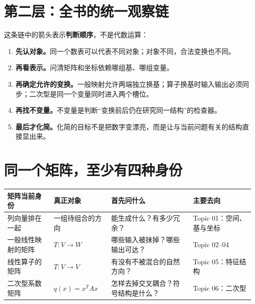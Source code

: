 \documentclass[11pt,a4paper]{ctexart}
\newcommand{\kw}[1]{\textbf{\color{deep}#1}}
\begin{document}
\section{第二层：全书的统一观察链}

\begin{center}
\end{center}

这条链中的箭头表示\kw{判断顺序}，不是代数运算：

\begin{enumerate}
  \item \kw{先认对象。}同一个数表可以代表不同对象；对象不同，合法变换也不同。
  \item \kw{再看表示。}问清矩阵和坐标依赖哪组基、哪组变量。
  \item \kw{再确定允许的变换。}一般映射允许两端独立换基；算子换基时输入输出必须同步；二次型是同一个变量同时进入两个槽位。
  \item \kw{再找不变量。}不变量是判断“变换前后仍在研究同一结构”的检查器。
  \item \kw{最后才化简。}化简的目标不是把数字变漂亮，而是让与当前问题有关的结构直接显出来。
\end{enumerate}

\section{同一个矩阵，至少有四种身份}

\begin{longtable}{L{3.2cm}L{3.3cm}L{5.2cm}L{3.7cm}}
\toprule
\textbf{矩阵当前身份} & \textbf{真正对象} & \textbf{首先问什么} & \textbf{主要去向}\\
\midrule
列向量排在一起 & 一组待组合的方向 & 能生成什么？有多少冗余？ & Topic 01：空间、基与坐标\\
一般线性映射的矩阵 & $T:V\to W$ & 哪些输入被抹掉？哪些输出可达？ & Topic 02--04\\
线性算子的矩阵 & $T:V\to V$ & 有没有不被混合的自然方向？ & Topic 05：特征结构\\
二次型系数矩阵 & $q(x)=x^TAx$ & 怎样去掉交叉耦合？符号结构是什么？ & Topic 06：二次型\\
\bottomrule
\end{longtable}
\end{document}
